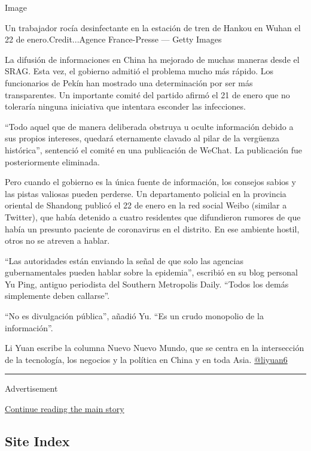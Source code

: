 Image

Un trabajador rocía desinfectante en la estación de tren de Hankou en
Wuhan el 22 de enero.Credit...Agence France-Presse --- Getty Images

La difusión de informaciones en China ha mejorado de muchas maneras
desde el SRAG. Esta vez, el gobierno admitió el problema mucho más
rápido. Los funcionarios de Pekín han mostrado una determinación por ser
más transparentes. Un importante comité del partido afirmó el 21 de
enero que no toleraría ninguna iniciativa que intentara esconder las
infecciones.

``Todo aquel que de manera deliberada obstruya u oculte información
debido a sus propios intereses, quedará eternamente clavado al pilar de
la vergüenza histórica'', sentenció el comité en una publicación de
WeChat. La publicación fue posteriormente eliminada.

Pero cuando el gobierno es la única fuente de información, los consejos
sabios y las pistas valiosas pueden perderse. Un departamento policial
en la provincia oriental de Shandong publicó el 22 de enero en la red
social Weibo (similar a Twitter), que había detenido a cuatro residentes
que difundieron rumores de que había un presunto paciente de coronavirus
en el distrito. En ese ambiente hostil, otros no se atreven a hablar.

``Las autoridades están enviando la señal de que solo las agencias
gubernamentales pueden hablar sobre la epidemia'', escribió en su blog
personal Yu Ping, antiguo periodista del Southern Metropolis Daily.
``Todos los demás simplemente deben callarse''.

``No es divulgación pública'', añadió Yu. ``Es un crudo monopolio de la
información''.

Li Yuan escribe la columna Nuevo Nuevo Mundo, que se centra en la
intersección de la tecnología, los negocios y la política en China y en
toda Asia. \href{https://twitter.com/liyuan6}{@liyuan6}

\begin{center}\rule{0.5\linewidth}{\linethickness}\end{center}

Advertisement

\protect\hyperlink{after-bottom}{Continue reading the main story}

\hypertarget{site-index}{%
\subsection{Site Index}\label{site-index}}

